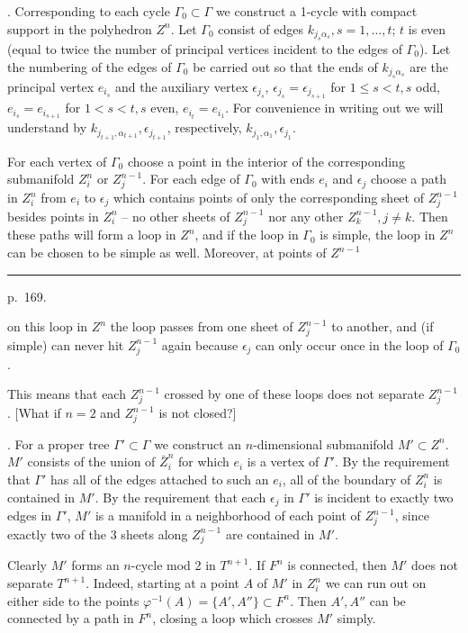 \documentclass{amsart}
\theoremstyle{plain}
\theoremstyle{definition}
\begin{document}
. Corresponding to each cycle $\Gamma_0 \subset \Gamma$
we construct a 1-cycle with compact support in the polyhedron
$Z^n$. Let $\Gamma_0$ consist of edges $k_{j_s\alpha_s},
s=1,\ldots, t$; $t$ is even (equal to twice the number of
principal vertices incident to the edges of $\Gamma_0$).
Let the numbering of the edges of $\Gamma_0$ be carried
out so that the ends of $k_{j_s\alpha_s}$ are the principal
vertex $e_{i_s}$ and the auxiliary vertex $\epsilon_{j_s}$,
$\epsilon_{j_s} = \epsilon_{j_{s+1}}$ for $1 \le s < t, s$ odd,
$e_{i_s} = e_{i_{s+1}}$ for $1<s<t, s$ even, $e_{i_t} = e_{i_1}$.
For convenience in writing out we will understand by
$k_{j_{t+1},\alpha_{t+1}}, \epsilon_{j_{t+1}}$, respectively,
$k_{j_1,\alpha_1}, \epsilon_{j_1}$.
\begin{lem}\label{Lemma 17} For each vertex of $\Gamma_0$ choose
a point in the interior of the corresponding submanifold $Z^n_i$
or $Z^{n-1}_j$. For each edge of $\Gamma_0$ with ends $e_i$
and $\epsilon_j$ choose a path in $Z^n_i$ from $e_i$ to
$\epsilon_j$ which contains points of only the corresponding
sheet of $Z^{n-1}_j$ besides points in $Z^n_i$ -- no other sheets
of $Z^{n-1}_j$ nor any other $Z^{n-1}_k, j \ne k$. Then these
paths will form a loop in $Z^n$, and if the loop in $\Gamma_0$
is simple, the loop in $Z^n$ can be chosen to be simple as well.
Moreover, at points of $Z^{n-1}$

\medskip
\hrule\smallskip
\noindent p.~169.
\medskip

\noindent on this loop in $Z^n$ the loop passes from one sheet of
$Z^{n-1}_j$ to another, and (if simple) can never hit $Z^{n-1}_j$
again because $\epsilon_j$ can only occur once in the loop of
$\Gamma_0$.
\end{lem}

This means that each $Z^{n-1}_j$ crossed by one of these loops
does not separate $Z^{n-1}_j$. [What if $n=2$ and $Z^{n-1}_j$ is
not closed?]

. For a proper tree $\Gamma' \subset \Gamma$ we construct
an $n$-dimensional submanifold $M'\subset Z^n$. $M'$ consists
of the union of ${\bar Z}^n_i$ for which $e_i$ is a vertex of
$\Gamma'$. By the requirement that $\Gamma'$ has all of the
edges attached to such an $e_i$, all of the boundary of $Z^n_i$
is contained in $M'$. By the requirement that each $\epsilon_j$
in $\Gamma'$ is incident to exactly two edges in $\Gamma'$,
$M'$ is a manifold in a neighborhood of each point of $Z^{n-1}_j$,
since exactly two of the 3 sheets along $Z^{n-1}_j$ are contained
in $M'$.
\begin{lem}\label{Lemma 18} Clearly $M'$ forms an $n$-cycle mod 2 in
$T^{n+1}$. If $F^n$ is connected, then $M'$ does not separate
$T^{n+1}$. Indeed, starting at a point $A$ of $M'$ in $Z^n_i$ we
can run out on either side to the points $\varphi^{-1}(A) =
\{ A', A''\} \subset F^n$. Then $A', A''$ can be connected by a
path in $F^n$, closing a loop which crosses $M'$ simply.
\end{lem}
\end{document}
